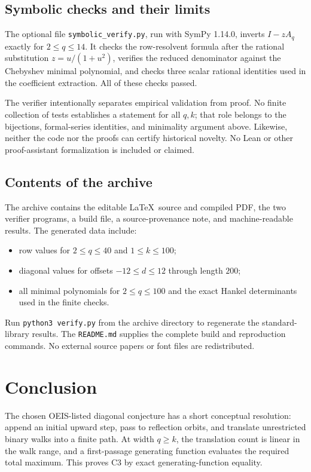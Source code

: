 \documentclass[11pt,letterpaper]{article}
\numberwithin{equation}{section}
\theoremstyle{definition}
\begin{document}
\subsection{Symbolic checks and their limits}
The optional file \texttt{symbolic\_verify.py}, run with SymPy 1.14.0,
inverts $I-zA_q$ exactly for $2\le q\le14$.  It checks the row-resolvent
formula after the rational substitution $z=u/(1+u^2)$, verifies the
reduced denominator against the Chebyshev minimal polynomial, and checks
three scalar rational identities used in the coefficient extraction.
All of these checks passed.

The verifier intentionally separates empirical validation from proof.
No finite collection of tests establishes a statement for all $q,k$;
that role belongs to the bijections, formal-series identities, and
minimality argument above.  Likewise, neither the code nor the proofs
can certify historical novelty.  No Lean or other proof-assistant
formalization is included or claimed.

\subsection{Contents of the archive}
The archive contains the editable \LaTeX\ source and compiled PDF,
the two verifier programs, a build file, a source-provenance note, and
machine-readable results.  The generated data include:
\begin{itemize}
\item row values for $2\le q\le40$ and $1\le k\le100$;
\item diagonal values for offsets $-12\le d\le12$ through length $200$;
\item all minimal polynomials for $2\le q\le100$ and the exact Hankel
  determinants used in the finite checks.
\end{itemize}
Run \texttt{python3 verify.py} from the archive directory to regenerate
the standard-library results.  The \texttt{README.md} supplies the
complete build and reproduction commands.  No external source papers
or font files are redistributed.

\section{Conclusion}
The chosen OEIS-listed diagonal conjecture has a short conceptual
resolution: append an initial upward step, pass to reflection orbits,
and translate unrestricted binary walks into a finite path.  At width
$q\ge k$, the translation count is linear in the walk range, and a
first-passage generating function evaluates the required total maximum.
This proves C3 by exact generating-function equality.
\end{document}
